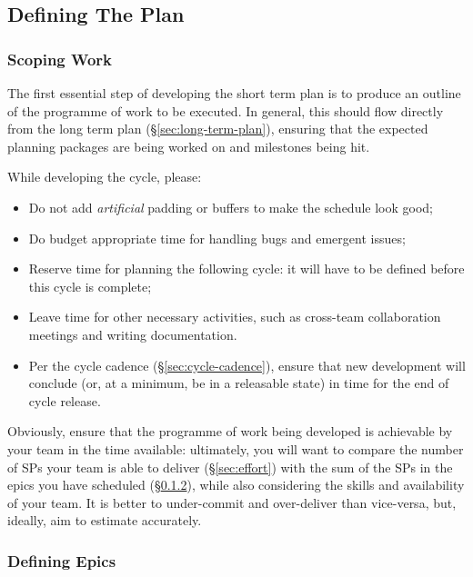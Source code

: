 \subsection{Defining The Plan}\label{defining-the-plan}

\subsubsection{Scoping Work}\label{scoping-work}

The first essential step of developing the short term plan is to produce an outline of the programme of work to be executed.
In general, this should flow directly from the long term plan (\S\ref{sec:long-term-plan}), ensuring that the expected planning packages are being worked on and milestones being hit.

While developing the cycle, please:

\begin{itemize}
\item
  Do not add \emph{artificial} padding or buffers to make the schedule
  look good;
\item
  Do budget appropriate time for handling bugs and emergent issues;
\item
  Reserve time for planning the following cycle: it will have to be
  defined before this cycle is complete;
\item
  Leave time for other necessary activities, such as cross-team
  collaboration meetings and writing documentation.
\item
  Per the cycle cadence (\S\ref{sec:cycle-cadence}),
  ensure that new development will conclude (or, at a minimum, be in a
  releasable state) in time for the end of cycle release.
\end{itemize}

Obviously, ensure that the programme of work being developed is
achievable by your team in the time available: ultimately, you will want
to compare the
number of SPs your team is able to deliver (\S\ref{sec:effort})
with the sum of the SPs in the
epics you have scheduled (\S\ref{sec:planning-epics}),
while also considering the skills and availability of your team. It is
better to under-commit and over-deliver than vice-versa, but, ideally,
aim to estimate accurately.

\subsubsection{Defining Epics}
\label{sec:planning-epics}

